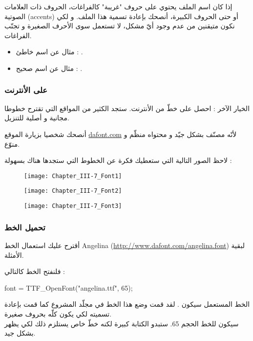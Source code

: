 إذا كان اسم الملف يحتوي على حروف "غريبة" كالفراغات، الحروف ذات العلامات الصوتية 
(\textenglish{accents})
أو حتى الحروف الكبيرة، أنصحك بإعادة تسمية هذا الملف. و لكي نكون متيقنين من عدم وجود أيّ مشكل، لا تستعمل سوى الأحرف الصغيرة و تجنّب الفراغات.

\begin{itemize}
	\item مثال عن اسم خاطئ : 
	.
	\item مثال عن اسم صحيح :
	.
\end{itemize}

\subsubsection{على الأنترنت}

الخيار الآخر : احصل على خطّ من الأنترنت. ستجد الكثير من المواقع التي تقترح خطوطا مجانية و أصلية للتنزيل.

أنصحك شخصيا بزيارة الموقع
\href{http://www.dafont.com/}{\textenglish{dafont.com}}
لأنّه مصنّف بشكل جيّد و محتواه منظّم و منوّع.

لاحظ الصور التالية التي ستعطيك فكرة عن الخطوط التي ستجدها هناك بسهولة :

\begin{figure}[H]
	\centering
	\texttt{[image: Chapter\_III-7\_Font1]}
\end{figure}
\begin{figure}[H]
	\centering
	\texttt{[image: Chapter\_III-7\_Font2]}
\end{figure}
\begin{figure}[H]
	\centering
	\texttt{[image: Chapter\_III-7\_Font3]}
\end{figure}

\subsubsection{تحميل الخط}

 أقترح عليك استعمال الخط 
\textenglish{Angelina} (\url{http://www.dafont.com/angelina.font})
 لبقية الأمثلة.

فلنفتح الخط كالتالي  :

\begin{Csource}
font = TTF_OpenFont("angelina.ttf", 65);
\end{Csource}

الخط المستعمل سيكون
.
لقد قمت وضع هذا الخط في مجلّد المشروع كما قمت بإعادة تسميته لكي يكون كلّه بحروف صغيرة.\\
سيكون للخط الحجم 65. ستبدو الكتابة كبيرة لكنه خطّ خاص يستلزم ذلك لكي يظهر بشكل جيد.

